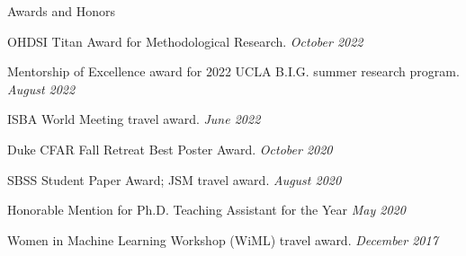 \documentclass{resume} %
\begin{document}



%


\begin{rSection}{Awards and Honors}

OHDSI Titan Award for Methodological Research. 
\hfill {\em October 2022}

Mentorship of Excellence award for 2022 UCLA B.I.G. summer research program. \hfill {\em August 2022}

ISBA World Meeting travel award.
\hfill {\em June 2022}

Duke CFAR Fall Retreat Best Poster Award. 
\hfill {\em October 2020}

SBSS Student Paper Award; JSM travel award. \hfill {\em August 2020}

Honorable Mention for Ph.D. Teaching Assistant for the Year
\hfill {\em May 2020}

Women in Machine Learning Workshop (WiML) travel award. \hfill {\em December 2017}

\end{rSection}
\end{document}
